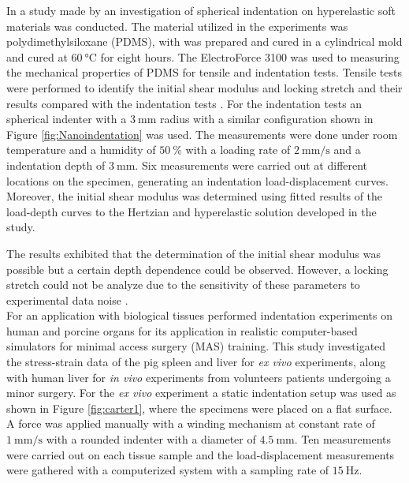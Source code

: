In a study made by \citet{Zhang2014} an investigation of spherical indentation on hyperelastic 
soft materials was conducted. The material utilized in the experiments was polydimethylsiloxane (PDMS),
with was prepared and cured in a cylindrical mold and cured at $\SI{60}{\degreeCelsius}$ for eight hours. 
The ElectroForce 3100 was used to measuring the mechanical properties of PDMS for tensile and 
indentation tests. Tensile tests were performed to identify the initial shear modulus and 
locking stretch and their results compared with the indentation tests \cite{Zhang2014}. 
For the indentation tests an spherical indenter with a $\SI{3}{\milli \m}$ radius with a similar configuration 
shown in Figure \ref{fig:Nanoindentation} was used. The measurements were done under room temperature and 
a humidity of $\SI{50}{\percent}$ with a loading rate of $\SI[per-mode = symbol]{2}{\milli \m\per \second}$ and 
a indentation depth of $\SI{3}{\milli \m}$. Six measurements were carried out at different 
locations on the specimen, generating an indentation load-displacement curves. 
Moreover, the initial shear modulus was determined using fitted results of the load-depth curves to 
the Hertzian and hyperelastic solution developed in the study.

The results exhibited that the determination of the initial shear modulus was possible but a 
certain depth dependence could be observed. However, a locking stretch could not be analyze due to the 
sensitivity of these parameters to experimental data noise \cite{Zhang2014}.\\

For an application with biological tissues \citet{Carter2001} performed indentation experiments on 
human and porcine organs for its application in realistic computer-based simulators 
for minimal access surgery (MAS) training. 
This study investigated the stress-strain data of the pig spleen and liver for \textit{ex vivo} experiments, 
along with human liver for \textit{in vivo} experiments from volunteers patients undergoing a minor 
surgery. For the \textit{ex vivo} experiment a static indentation setup was used as shown in Figure 
\ref{fig:carter1}, where the specimens were placed on a flat surface. A force was applied 
manually with a winding mechanism at constant rate of $\SI[per-mode = symbol]{1}{\milli \m\per \second}$ 
with a rounded indenter with a diameter of $\SI{4.5}{\milli \m}$. Ten measurements were 
carried out on each tissue sample and the load-displacement measurements were 
gathered with a computerized system with a sampling rate of $\SI{15}{\hertz}$.\\

